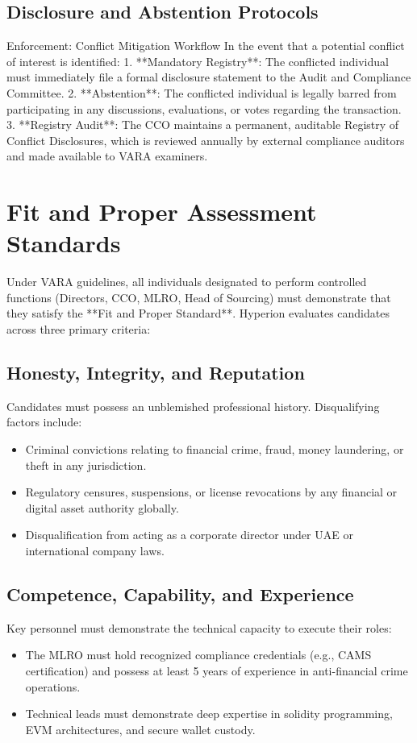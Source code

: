 \documentclass[11pt]{article}
\begin{document}
\subsection{Disclosure and Abstention Protocols}
\begin{regulatorybox}{Enforcement: Conflict Mitigation Workflow}
In the event that a potential conflict of interest is identified:
1. **Mandatory Registry**: The conflicted individual must immediately file a formal disclosure statement to the Audit and Compliance Committee.
2. **Abstention**: The conflicted individual is legally barred from participating in any discussions, evaluations, or votes regarding the transaction.
3. **Registry Audit**: The CCO maintains a permanent, auditable Registry of Conflict Disclosures, which is reviewed annually by external compliance auditors and made available to VARA examiners.
\end{regulatorybox}

\section{Fit and Proper Assessment Standards}
Under VARA guidelines, all individuals designated to perform controlled functions (Directors, CCO, MLRO, Head of Sourcing) must demonstrate that they satisfy the **Fit and Proper Standard**. Hyperion evaluates candidates across three primary criteria:

\subsection{Honesty, Integrity, and Reputation}
Candidates must possess an unblemished professional history. Disqualifying factors include:
\begin{itemize}
    \item Criminal convictions relating to financial crime, fraud, money laundering, or theft in any jurisdiction.
    \item Regulatory censures, suspensions, or license revocations by any financial or digital asset authority globally.
    \item Disqualification from acting as a corporate director under UAE or international company laws.
\end{itemize}

\subsection{Competence, Capability, and Experience}
Key personnel must demonstrate the technical capacity to execute their roles:
\begin{itemize}
    \item The MLRO must hold recognized compliance credentials (e.g., CAMS certification) and possess at least 5 years of experience in anti-financial crime operations.
    \item Technical leads must demonstrate deep expertise in solidity programming, EVM architectures, and secure wallet custody.
\end{itemize}
\end{document}
